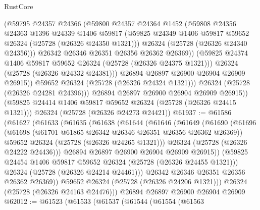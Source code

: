 \begin{lexlean}{RustCore}
\begin{coremodule}
                  (@59795
                    @24357
                    @24366
                    (@59800
                      @24357
                      @24364
                      @1452
                      (@59808
                        @24356
                        @24363
                        @1396
                        @24339
                        @1406
                        @59817
                        (@59825 @24349 @1406 @59817 @59652 @26324 (@25728 (@26326 @24350 @1321)))
                        @26324
                        (@25728 (@26326 @24340 @24356)))
                      @26342
                      @26346
                      @26351
                      @26356
                      @26362
                      @26369))
                  (@59825 @24374 @1406 @59817 @59652 @26324 (@25728 (@26326 @24375 @1321)))
                  @26324
                  (@25728 (@26326 @24332 @24381)))
                @26894
                @26897
                @26900
                @26904
                @26909
                @26915))
            @59652
            @26324
            (@25728 (@26326 @24324 @1321)))
          @26324
          (@25728 (@26326 @24281 @24396)))
        @26894
        @26897
        @26900
        @26904
        @26909
        @26915))
    (@59825 @24414 @1406 @59817 @59652 @26324 (@25728 (@26326 @24415 @1321)))
    @26324
    (@25728 (@26326 @24273 @24421))
@61937 := @61586
    (@61627
      (@61633
        (@61635
          (@61638
            (@61644
              (@61646
                (@61649
                  (@61690
                    (@61696
                      (@61698 (@61701 @61865 @26342 @26346 @26351 @26356 @26362 @26369))
                      @59652
                      @26324
                      (@25728 (@26326 @24265 @1321)))
                    @26324
                    (@25728 (@26326 @24222 @24436)))
                  @26894
                  @26897
                  @26900
                  @26904
                  @26909
                  @26915))
              (@59825 @24454 @1406 @59817 @59652 @26324 (@25728 (@26326 @24455 @1321)))
              @26324
              (@25728 (@26326 @24214 @24461)))
            @26342
            @26346
            @26351
            @26356
            @26362
            @26369))
        @59652
        @26324
        (@25728 (@26326 @24206 @1321)))
      @26324
      (@25728 (@26326 @24163 @24476)))
    @26894
    @26897
    @26900
    @26904
    @26909
@62012 := @61523
    (@61533
      (@61537
        (@61544
          (@61554
            (@61563

\end{coremodule}
\end{lexlean}
